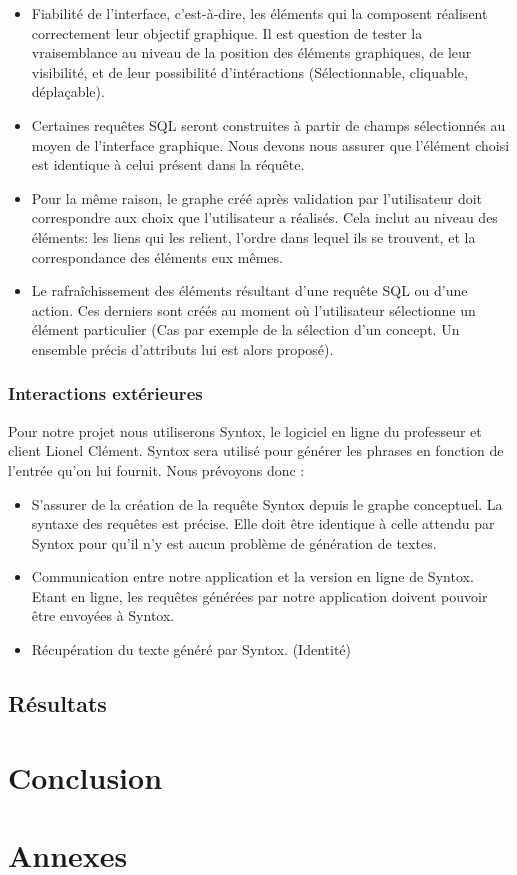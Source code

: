 \documentclass[12pt]{report}
\begin{document}
	\begin{itemize}
	
	\item Fiabilité de l'interface, c'est-à-dire, les éléments qui la composent réalisent correctement leur objectif graphique. Il est question de tester la vraisemblance au niveau de la position des éléments graphiques, de leur visibilité, et de leur possibilité d'intéractions (Sélectionnable, cliquable, déplaçable). 
	\item Certaines requêtes SQL seront construites à partir de champs sélectionnés au moyen de l'interface graphique. Nous devons nous assurer que l'élément choisi est identique à celui présent dans la réquête.
	\item Pour la même raison, le graphe créé après validation par l'utilisateur doit correspondre aux choix que l'utilisateur a réalisés. Cela inclut au niveau des éléments: les liens qui les relient, l'ordre dans lequel ils se trouvent, et la correspondance des éléments eux mêmes.
	\item Le rafraîchissement des éléments résultant d'une requête SQL ou d'une action. Ces derniers sont créés au moment où l'utilisateur sélectionne un élément particulier (Cas par exemple de la sélection d'un concept. Un ensemble précis d'attributs lui est alors proposé).

	\end{itemize}

\subsection{Interactions extérieures}

Pour notre projet nous utiliserons Syntox, le logiciel en ligne du professeur et client Lionel Clément. Syntox sera utilisé pour générer les phrases en fonction de l'entrée qu'on lui fournit. 
Nous prévoyons donc :

	\begin{itemize}
	
	\item S'assurer de la création de la requête Syntox depuis le graphe conceptuel. La syntaxe des requêtes est précise. Elle doit être identique à celle attendu par Syntox pour qu'il n'y est aucun problème de génération de textes.
	\item Communication entre notre application et la version en ligne de Syntox. Etant en ligne, les requêtes générées par notre application doivent pouvoir être envoyées à Syntox.
	\item Récupération du texte généré par Syntox. (Identité)

	\end{itemize}
	
\section{Résultats}

\chapter{Conclusion}

\chapter{Annexes}



\end{document}
